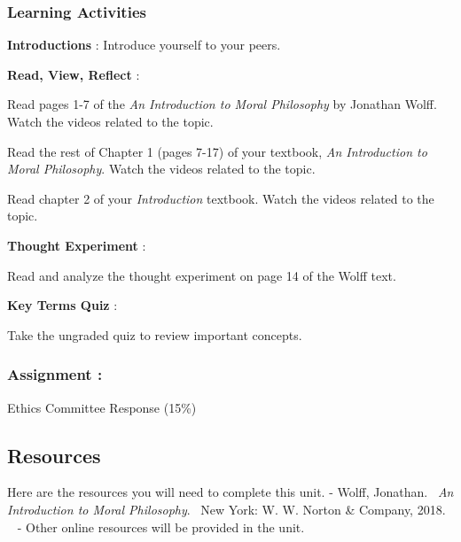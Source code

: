 \documentclass[
]{book}
\begin{document}
\begin{reflect}
\hypertarget{learning-activities}{%
\subsubsection*{Learning Activities}\label{learning-activities}}

\textbf{Introductions} : Introduce yourself to your peers.

\textbf{Read, View, Reflect} :

Read pages 1-7 of the \emph{An Introduction to Moral Philosophy} by Jonathan Wolff. Watch the videos related to the topic.

Read the rest of Chapter 1 (pages 7-17) of your textbook, \emph{An Introduction to Moral Philosophy}. Watch the videos related to the topic.

Read chapter 2 of your \emph{Introduction} textbook. Watch the videos related to the topic.

\textbf{Thought Experiment} :

Read and analyze the thought experiment on page 14 of the Wolff text.

\textbf{Key Terms Quiz} :

Take the ungraded quiz to review important concepts.

\hypertarget{assignment}{%
\subsubsection{\texorpdfstring{\textbf{Assignment} :}{Assignment :}}\label{assignment}}

Ethics Committee Response (15\%)
\end{reflect}

\hypertarget{resources}{%
\subsection*{Resources}\label{resources}}

Here are the resources you will need to complete this unit.
- Wolff, Jonathan. ~\emph{An Introduction to Moral Philosophy}. ~New York: W. W. Norton \& Company, 2018. ~
- Other online resources will be provided in the unit.
\end{document}
